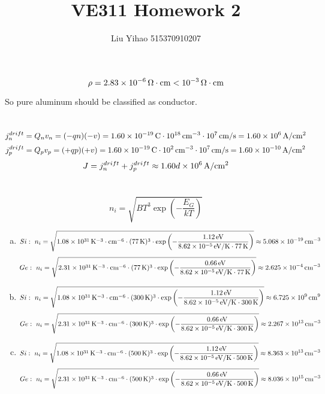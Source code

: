 \documentclass{article}
\title{VE311 Homework 2}
\author{Liu Yihao 515370910207}
\date{}
\newcommand{\Omegacm}{{\rm\,\Omega\cdot cm}}
\newcommand{\unit}[1]{{\rm\,#1}}
\begin{document}
\maketitle

\section{}
$$\rho=2.83\times10^{-6}\Omegacm<10^{-3}\Omegacm$$

So pure aluminum should be classified as conductor.

\section{}
$$j_n^{drift}=Q_nv_n=(-qn)(-v)=1.60\times10^{-19}\unit{C}\cdot10^{18}\unit{cm^{-3}}\cdot10^7\unit{cm/s}=1.60\times10^6\unit{A/cm^2}$$
$$j_p^{drift}=Q_pv_p=(+qp)(+v)=1.60\times10^{-19}\unit{C}\cdot10^{2}\unit{cm^{-3}}\cdot10^7\unit{cm/s}=1.60\times10^{-10}\unit{A/cm^2}$$
$$J=j_n^{drift}+j_p^{drift}\approx1.60d\times10^6\unit{A/cm^2}$$

\section{}
$$n_i=\sqrt{BT^3\exp\left(-\frac{E_G}{kT}\right)}$$

\begin{enumerate}[(a)]
\item
$$Si:\ n_i=\sqrt{1.08\times10^{31}\unit{K^{-3}\cdot cm^{-6}}\cdot(77\unit{K})^3\cdot\exp\left(-\frac{1.12\unit{eV}}{8.62\times10^{-5}\unit{eV/K}\cdot77\unit{K}}\right)}\approx5.068\times10^{-19}\unit{cm^{-3}}$$
$$Ge:\ n_i=\sqrt{2.31\times10^{31}\unit{K^{-3}\cdot cm^{-6}}\cdot(77\unit{K})^3\cdot\exp\left(-\frac{0.66\unit{eV}}{8.62\times10^{-5}\unit{eV/K}\cdot77\unit{K}}\right)}\approx2.625\times10^{-4}\unit{cm^{-3}}$$
\item
$$Si:\ n_i=\sqrt{1.08\times10^{31}\unit{K^{-3}\cdot cm^{-6}}\cdot(300\unit{K})^3\cdot\exp\left(-\frac{1.12\unit{eV}}{8.62\times10^{-5}\unit{eV/K}\cdot300\unit{K}}\right)}\approx6.725\times10^{9}\unit{cm^{9}}$$
$$Ge:\ n_i=\sqrt{2.31\times10^{31}\unit{K^{-3}\cdot cm^{-6}}\cdot(300\unit{K})^3\cdot\exp\left(-\frac{0.66\unit{eV}}{8.62\times10^{-5}\unit{eV/K}\cdot300\unit{K}}\right)}\approx2.267\times10^{13}\unit{cm^{-3}}$$
\item
$$Si:\ n_i=\sqrt{1.08\times10^{31}\unit{K^{-3}\cdot cm^{-6}}\cdot(500\unit{K})^3\cdot\exp\left(-\frac{1.12\unit{eV}}{8.62\times10^{-5}\unit{eV/K}\cdot500\unit{K}}\right)}\approx8.363\times10^{13}\unit{cm^{-3}}$$
$$Ge:\ n_i=\sqrt{2.31\times10^{31}\unit{K^{-3}\cdot cm^{-6}}\cdot(500\unit{K})^3\cdot\exp\left(-\frac{0.66\unit{eV}}{8.62\times10^{-5}\unit{eV/K}\cdot500\unit{K}}\right)}\approx8.036\times10^{15}\unit{cm^{-3}}$$
\end{enumerate} 
\end{document}
